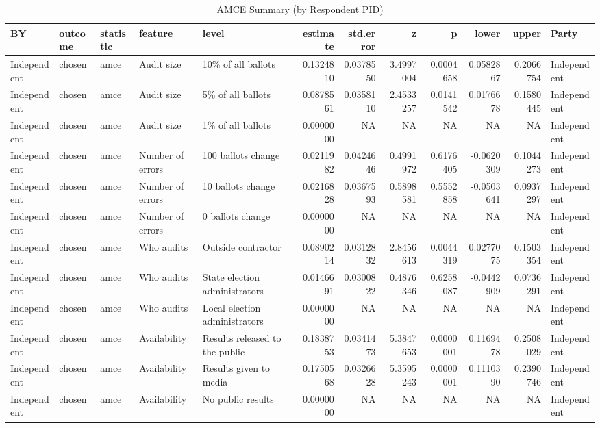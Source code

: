 \begin{table}

\caption{AMCE Summary (by Respondent PID)}
\centering
\begin{tabular}[t]{lllllrrrrrrl}
\toprule
BY & outcome & statistic & feature & level & estimate & std.error & z & p & lower & upper & Party\\
\midrule
Independent & chosen & amce & Audit size & 10\% of all ballots & 0.1324810 & 0.0378550 & 3.4997004 & 0.0004658 & 0.0582867 & 0.2066754 & Independent\\
Independent & chosen & amce & Audit size & 5\% of all ballots & 0.0878561 & 0.0358110 & 2.4533257 & 0.0141542 & 0.0176678 & 0.1580445 & Independent\\
Independent & chosen & amce & Audit size & 1\% of all ballots & 0.0000000 & NA & NA & NA & NA & NA & Independent\\
Independent & chosen & amce & Number of errors & 100 ballots change & 0.0211982 & 0.0424646 & 0.4991972 & 0.6176405 & -0.0620309 & 0.1044273 & Independent\\
Independent & chosen & amce & Number of errors & 10 ballots change & 0.0216828 & 0.0367593 & 0.5898581 & 0.5552858 & -0.0503641 & 0.0937297 & Independent\\
\addlinespace
Independent & chosen & amce & Number of errors & 0 ballots change & 0.0000000 & NA & NA & NA & NA & NA & Independent\\
Independent & chosen & amce & Who audits & Outside contractor & 0.0890214 & 0.0312832 & 2.8456613 & 0.0044319 & 0.0277075 & 0.1503354 & Independent\\
Independent & chosen & amce & Who audits & State election administrators & 0.0146691 & 0.0300822 & 0.4876346 & 0.6258087 & -0.0442909 & 0.0736291 & Independent\\
Independent & chosen & amce & Who audits & Local election administrators & 0.0000000 & NA & NA & NA & NA & NA & Independent\\
Independent & chosen & amce & Availability & Results released to the public & 0.1838753 & 0.0341473 & 5.3847653 & 0.0000001 & 0.1169478 & 0.2508029 & Independent\\
\addlinespace
Independent & chosen & amce & Availability & Results given to media & 0.1750568 & 0.0326628 & 5.3595243 & 0.0000001 & 0.1110390 & 0.2390746 & Independent\\
Independent & chosen & amce & Availability & No public results & 0.0000000 & NA & NA & NA & NA & NA & Independent\\

\end{tabular}
\end{table}
